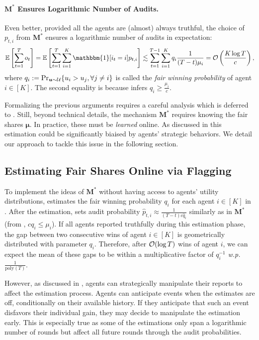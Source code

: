 \paragraph{$\bm M^\ast$ Ensures Logarithmic Number of Audits.}
Even better, provided all the agents are (almost) always truthful, the choice of $p_{t,i}$ from $\bm M^\ast$ ensures a logarithmic number of audits in expectation:
\begin{equation*}
\mathbb{E}\left [\sum_{t=1}^T o_t\right ]=
\mathbb{E}\left [\sum_{t=1}^T \sum_{i=1}^K \mathbbm{1}[i_t=i] p_{t,i}\right ]\lesssim \sum_{t=1}^{T-1} \sum_{i=1}^K q_{i} \frac{1}{(T-t) \mu_i}=\O\left (\frac{K\log T}{c}\right ),
\end{equation*}
where $q_{i}:=\Pr_{\bm u\sim \mathcal{U}}\{u_i>u_{j},\forall j\ne i\}$ is called the \textit{fair winning probability} of agent $i\in [K]$. The second equality is because  infers $q_i\ge \frac{\mu_i}{c}$.

Formalizing the previous arguments requires a careful analysis which is deferred to . Still, beyond technical details, the mechanism $\bm M^\ast$ requires knowing the fair shares $\bm\mu$. In practice, these must be \emph{learned} online. As discussed in  this estimation could be significantly biaised by agents' strategic behaviors. We detail our approach to tackle this issue in the following section.

\subsection{Estimating Fair Shares Online via Flagging}\label{sec:description of est and flag}

To implement the ideas of $\bm M^\ast$ without having access to agents' utility distributions, \mechname estimates the fair winning probability $q_i$ for each agent $i\in[K]$ in . After the estimation, \mechname sets audit probability $\hat p_{t,i}\approx \frac{1}{(T-t)c\hat q_i}$ similarly as in $\bm M^\ast$ (from , $c q_i\leq \mu_i$). 
If all agents reported truthfully during this estimation phase, the gap between two consecutive wins of agent $i\in[K]$ is geometrically distributed with parameter $q_i$. Therefore, after $\operatorname{\mathcal O}(\log T)$ wins of agent $i$, we can expect the mean of these gaps to be within a multiplicative factor of $q_i^{-1}$ \textit{w.p.} $\frac{1}{\text{poly}(T)}$.

However, as discussed in , agents can strategically manipulate their reports to affect the estimation process. Agents can anticipate events when the estimates are off, conditionally on their available history. If they anticipate that such an event disfavors their individual gain, they may decide to manipulate the estimation early. This is especially true as some of the estimations only span a logarithmic number of rounds but affect all future rounds through the audit probabilities. 

